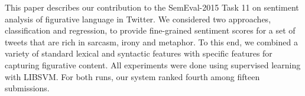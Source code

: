 This paper describes our contribution to the SemEval-2015 Task 11 on sentiment analysis of figurative language in Twitter. We considered two approaches, classification and regression, to provide fine-grained sentiment scores for a set of tweets that are rich in sarcasm, irony and metaphor. To this end, we combined a variety of standard lexical and syntactic features with specific features for capturing figurative content. All experiments were done using supervised learning with LIBSVM. For both runs, our system ranked fourth among fifteen submissions.
